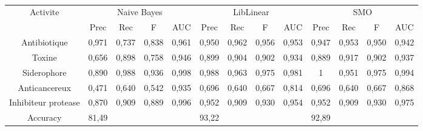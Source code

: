 \documentclass[a4paper,10pt]{report}
\begin{document}
	  \paragraph{} 
	   \begin{flushleft}
	    \leftskip -3cm
	    \begin{tabular}{|c||c|c|c|c||c|c|c|c||c|c|c|c|}\hline
	      {Activite} & \multicolumn{4}{c||}{Naive Bayes} & \multicolumn{4}{c||}{LibLinear} & \multicolumn{4}{c|}{SMO} \\\cline{2-13}
	       & Prec & Rec & F & AUC & Prec & Rec & F & AUC & Prec & Rec & F & AUC \\\hline
	      Antibiotique & 0,971 & 0,737 & 0,838 & 0,961 & 0,950 & 0,962 & 0,956 & 0,953 & 0,947 & 0,953 & 0,950 & 0,942 \\\hline
	      Toxine & 0,656 & 0,898 & 0,758 & 0,946 & 0,899 & 0,904 & 0,902 & 0,934 & 0,889 & 0,917 & 0,902 & 0,937  \\\hline
	      Siderophore & 0,890 & 0,988 & 0,936 & 0,998 & 0,988 & 0,963 & 0,975 & 0,981 & 1 & 0,951 & 0,975 & 0,994  \\\hline
	      Anticancereux & 0,471 & 0,640 & 0,542 & 0,935 & 0,696 & 0,640 & 0,667 & 0,814 & 0,696 & 0,640 & 0,667 & 0,868 \\\hline
	      Inhibiteur protease & 0,870 & 0,909 & 0,889 & 0,996 & 0,952 & 0,909 & 0,930 & 0,954 & 0,952 & 0,909 & 0,930 & 0,975 \\\hline
	      Accuracy & \multicolumn{4}{l||}{81,49} & \multicolumn{4}{l||}{93,22} & \multicolumn{4}{l|}{92,89} \\\hline
	    \end{tabular}
	     \label{tableau 1}
	  \end{flushleft}
	  
\end{document}
